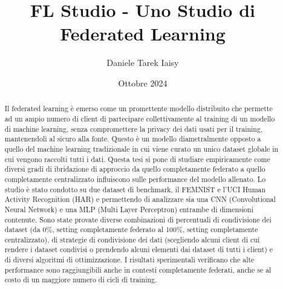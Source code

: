 \documentclass[12pt, a4paper]{report}
\begin{document}
\title{FL Studio - Uno Studio di Federated Learning}
\author{Daniele Tarek Iaisy}
\date{Ottobre 2024}
\maketitle

\begin{abstract}
Il federated learning è emerso come un promettente modello distribuito 
che permette ad un ampio numero di client di partecipare collettivamente
al training di un modello di machine learning, senza compromettere la 
privacy dei dati usati per il training, mantenendoli al sicuro alla 
fonte. Questo è un modello diametralmente opposto a quello del machine 
learning tradizionale in cui viene curato un unico dataset globale 
in cui vengono raccolti tutti i dati. Questa tesi si pone di studiare 
empiricamente come diversi gradi di ibridazione di approccio da quello 
completamente federato a quello completamente centralizzato influiscono
sulle performance del modello allenato.
Lo studio è stato condotto su due dataset di benchmark, il FEMNIST e 
l'UCI Human Activity Recognition (HAR) e permettendo di analizzare sia 
una CNN (Convolutional Neural Network) e una MLP (Multi Layer Perceptron)
entrambe di dimensioni contenute. 
Sono state provate diverse combinazioni
di percentuali di condivisione dei dataset (da 0\%, setting completamente
federato al 100\%, setting completamente centralizzato), di strategie 
di condivisione dei dati (scegliendo alcuni client di cui rendere i 
dataset condivisi o prendendo alcuni elementi dai dataset di tutti i 
client) e di diversi algoritmi di ottimizzazione.
I risultati sperimentali verificano che alte performance sono raggiungibili
anche in contesti completamente federati, anche se al costo di un 
maggiore numero di cicli di training.
\end{abstract}


\tableofcontents









\end{document}
